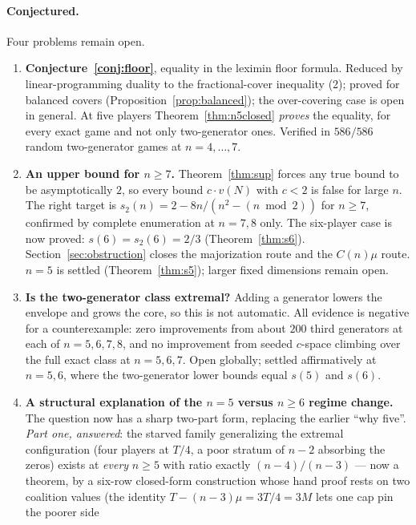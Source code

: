 \documentclass[11pt]{article}
\begin{document}
\paragraph{Conjectured.}
Four problems remain open.
\begin{enumerate}[label=(\arabic*),nosep]
\item \textbf{Conjecture~\ref{conj:floor}}, equality in the leximin floor
      formula.  Reduced by linear-programming duality to the fractional-cover
      inequality (2); proved for balanced covers
      (Proposition~\ref{prop:balanced}); the over-covering case is open in
      general.  At five players Theorem~\ref{thm:n5closed} \emph{proves}
      the equality, for every exact game and not only two-generator ones.
      Verified in $586/586$ random two-generator games at $n=4,\dots,7$.
\item \textbf{An upper bound for $n\ge7$.}  Theorem~\ref{thm:sup} forces any
      true bound
      to be asymptotically $2$, so every bound $c\cdot v(N)$ with $c<2$ is
      false for large $n$.  The right target is
      $s_2(n)=2-8n/(n^2-(n\bmod2))$ for $n\ge7$, confirmed by complete
      enumeration at $n=7,8$ only.  The six-player case is now proved:
      $s(6)=s_2(6)=2/3$ (Theorem~\ref{thm:s6}).
      Section~\ref{sec:obstruction} closes
      the majorization route and the $C(n)\mu$ route.  $n=5$ is settled
      (Theorem~\ref{thm:s5}); larger fixed dimensions remain open.
\item \textbf{Is the two-generator class extremal?}  Adding a generator
      lowers the envelope and grows the core, so this is not automatic.  All
      evidence is negative for a counterexample: zero improvements from about
      $200$ third generators at each of $n=5,6,7,8$, and no improvement from
      seeded $c$-space climbing over the full exact class at $n=5,6,7$.  Open
      globally; settled affirmatively at $n=5,6$, where the two-generator
      lower bounds equal $s(5)$ and $s(6)$.
\item \textbf{A structural explanation of the $n=5$ versus $n\ge6$ regime
      change.}  The question now has a sharp two-part form, replacing the
      earlier ``why five''.  \emph{Part one, answered}: the starved
      family generalizing the extremal configuration (four players at
      $T/4$, a poor stratum of $n-2$ absorbing the zeros) exists at
      \emph{every} $n\ge5$ with ratio
      exactly $(n-4)/(n-3)$ --- now a theorem, by a six-row closed-form
      construction whose hand proof rests on two coalition values (the
      identity $T-(n-3)\mu=3T/4=3M$ lets one cap pin the poorer side

\end{enumerate}
\end{document}
